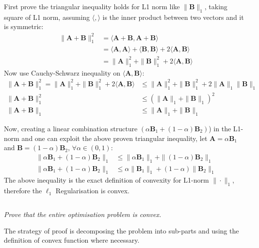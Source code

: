 \documentclass[12pt]{article}
\numberwithin{equation}{section}
\theoremstyle{remark}
\newcommand{\vect}[1]{\boldsymbol{#1}}
\newcommand{\norm}[2]{\|#1\|_{#2}}
\begin{document}
\medskip
First prove the triangular inequality holds for L1 norm like $\norm{\vect{B}}{1}$, taking square of L1 norm, assuming $\langle,\rangle$ is the inner product between two vectors and it is symmetric:
\begin{align}
\norm{\vect{A} + \vect{B}}{1}^{2} &= \langle \vect{A} + \vect{B}, \vect{A} + \vect{B} \rangle \\
&= \langle \vect{A}, \vect{A} \rangle + \langle \vect{B}, \vect{B} \rangle + 2\langle \vect{A},\vect{B} \rangle \\
&= \norm{\vect{A}}{1}^{2} + \norm{\vect{B}}{1}^{2} + 2\langle \vect{A},\vect{B} \rangle
\end{align}
Now use Cauchy-Schwarz inequality on $\langle \vect{A},\vect{B} \rangle$:
\begin{align}
\norm{\vect{A} + \vect{B}}{1}^{2} = \norm{\vect{A}}{1}^{2} + \norm{\vect{B}}{1}^{2} + 2\langle \vect{A},\vect{B} \rangle &\leq \norm{\vect{A}}{1}^{2} + \norm{\vect{B}}{1}^{2} + 2\norm{\vect{A}}{1}\norm{\vect{B}}{1} \\
\norm{\vect{A} + \vect{B}}{1}^{2} &\leq \left( \norm{\vect{A}}{1} + \norm{\vect{B}}{1} \right)^{2} \\
\norm{\vect{A} + \vect{B}}{1} &\leq \norm{\vect{A}}{1} + \norm{\vect{B}}{1}
\end{align}

\medskip
Now, creating a linear combination structure $\left(\alpha\vect{B}_{1} + (1-\alpha)\vect{B}_{2}\right)$) in the L1-norm and one can exploit the above proven triangular inequality, let $\vect{A} = \alpha \vect{B}_{1}$ and $ \vect{B} = (1 - \alpha)\vect{B}_{2}$, $\forall \alpha \in (0, 1)$:
\begin{align}
\norm{\alpha\vect{B}_{1} + (1-\alpha)\vect{B}_{2}}{1} &\leq \norm{\alpha\vect{B}_{1}}{1} + \norm{(1 - \alpha)\vect{B}_{2}}{1} \\
\norm{\alpha\vect{B}_{1} + (1-\alpha)\vect{B}_{2}}{1} &\leq \alpha\norm{\vect{B}_{1}}{1} + (1 - \alpha)\norm{\vect{B}_{2}}{1}
\end{align}
The above inequality is the exact definition of convexity for L1-norm $\norm{\cdot}{1}$, therefore the $\ell_1$ Regularisation is convex.

\subsection{}
\textit{Prove that the entire optimisation problem is convex.}

\medskip
The strategy of proof is decomposing the problem into sub-parts and using the definition of convex function where necessary.
\end{document}
